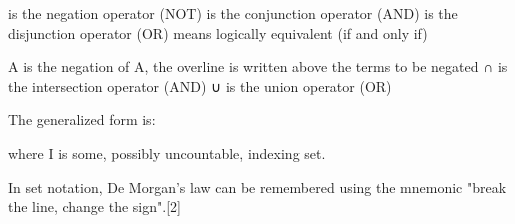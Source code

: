 



 is the negation operator (NOT) 
 is the conjunction operator (AND) 
 is the disjunction operator (OR) 
 means logically equivalent (if and only if)



A is the negation of A, the overline is written above the terms to be negated 
∩ is the intersection operator (AND) 
∪ is the union operator (OR) 



The generalized form is:

where I is some, possibly uncountable, indexing set.

In set notation, De Morgan's law can be remembered using the mnemonic "break the line, change the sign".[2]


